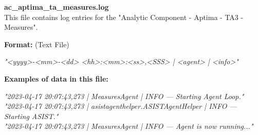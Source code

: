 \begin{description}
\begin{addmargin}[0em]{0em}
    \label{ac_aptima_ta3_measures.log}
    \begin{addmargin}[1em]{0em} %
        \textbf{ac\_aptima\_ta\_measures.log}\\
        This file contains log entries for the "Analytic Component - Aptima - TA3 - Measures".
        \begin{addmargin}[1em]{0em}
            \textbf{Format:} (Text File)
            \begin{addmargin}[1em]{0em}
                \textit{"<yyyy>-<mm>-<dd> <hh>:<mm>:<ss>,<SSS> | <agent> | <info>"}
            \end{addmargin}
        \end{addmargin}
        \begin{addmargin}[1em]{0em}
            \textbf{Examples of data in this file:}
                \begin{addmargin}[1em]{0em}\textit{"2023-04-17 20:07:43,273 | MeasuresAgent | INFO — Starting Agent Loop."\\
                 "2023-04-17 20:07:43,273 | asistagenthelper.ASISTAgentHelper | INFO — Starting ASIST."\\
                 "2023-04-17 20:07:43,273 | MeasuresAgent | INFO — Agent is now running..."}
             \end{addmargin}
        \end{addmargin}
    \end{addmargin} %
    \textbf{\\}


\end{addmargin}
\end{description}
